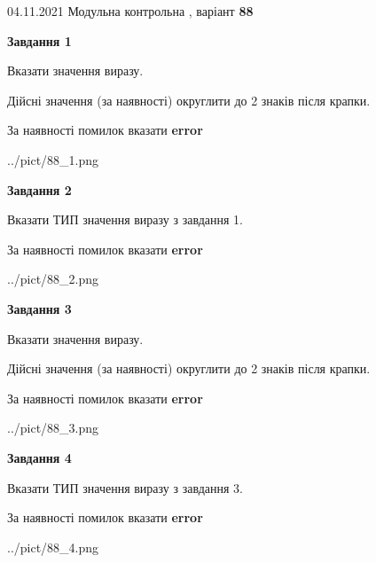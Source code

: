 \documentclass[11pt, ukrainian]{article}
\begin{document}
{04.11.2021 Модульна контрольна , варіант  \No \textbf { 88 }\par}
{
\begin {large}
{\begin {center}\textbf{Завдання 1}\end {center}}\par
Вказати значення виразу. \par
Дійсні значення (за наявності) округлити до 2 знаків після крапки. \par
За наявності помилок вказати \textbf{error}

\begin{center}
	{../pict/88_1.png}
\end{center}
\newpage

{\begin {center}\textbf{Завдання 2}\end {center}}\par
Вказати ТИП значення виразу з завдання 1. \par
За наявності помилок вказати \textbf{error}

\begin{center}
	{../pict/88_2.png}
\end{center}
\newpage

{\begin {center}\textbf{Завдання 3}\end {center}}\par
Вказати значення виразу. \par
Дійсні значення (за наявності) округлити до 2 знаків після крапки. \par
За наявності помилок вказати \textbf{error}

\begin{center}
	{../pict/88_3.png}
\end{center}
\newpage

{\begin {center}\textbf{Завдання 4}\end {center}}\par
Вказати ТИП значення виразу з завдання 3. \par
За наявності помилок вказати \textbf{error}

\begin{center}
	{../pict/88_4.png}
\end{center}
\newpage


\end{large}}
\end{document}
